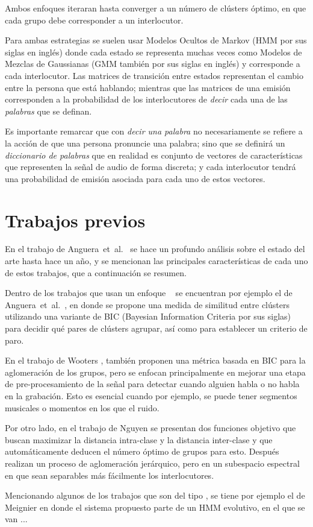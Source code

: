 Ambos enfoques iteraran hasta converger a un número de clústers óptimo, en que cada grupo debe corresponder a un interlocutor.

Para ambas estrategias se suelen usar Modelos Ocultos de Markov (HMM por sus siglas en inglés) donde cada estado se representa muchas veces como Modelos de Mezclas de Gaussianas (GMM también por sus siglas en inglés) y corresponde a cada interlocutor. Las matrices de transición entre estados representan el cambio entre la persona que está hablando; mientras que las matrices de una emisión corresponden a la probabilidad de los interlocutores de \textit{decir} cada una de las \textit{palabras} que se definan.

Es importante remarcar que con \textit{decir una palabra} no necesariamente se refiere a la acción de que una persona pronuncie una palabra; sino que se definirá un \textit{diccionario de palabras} que en realidad es conjunto de vectores de características que representen la señal de audio de forma discreta; y cada interlocutor tendrá una probabilidad de emisión asociada para cada uno de estos vectores.

\section{Trabajos previos}

En el trabajo de Anguera~et~al.~\cite{AngueraMiro2012} se hace un profundo análisis sobre el estado del arte hasta hace un año, y se mencionan las principales características de cada uno de estos trabajos, que a continuación se resumen.

Dentro de los trabajos que usan un enfoque \bu~ se encuentran por ejemplo el de Anguera~et~al.~\cite{AngueraMiro2006}, en donde se propone una medida de similitud entre clústers utilizando una variante de BIC (Bayesian Information Criteria por sus siglas) para decidir qué pares de clústers agrupar, así como para establecer un criterio de paro.

En el trabajo de Wooters \cite{Wooters2007}, también proponen una métrica basada en BIC para la aglomeración de los grupos, pero se enfocan principalmente en mejorar una etapa de pre-procesamiento de la señal para detectar cuando alguien habla o no habla en la grabación. Esto es esencial cuando por ejemplo, se puede tener segmentos musicales o momentos en los que el ruido.

Por otro lado, en el trabajo de Nguyen \cite{Nguyen2009} se presentan dos funciones objetivo que buscan maximizar la distancia intra-clase y la distancia inter-clase y que automáticamente deducen el número óptimo de grupos para esto. Después realizan un proceso de aglomeración jerárquico, pero en un subespacio espectral en que sean separables más fácilmente los interlocutores.

Mencionando algunos de los trabajos que son del tipo \td, se tiene por ejemplo el de Meignier \cite{Meignier2001} en donde el sistema propuesto parte de un HMM evolutivo, en el que se van ...



